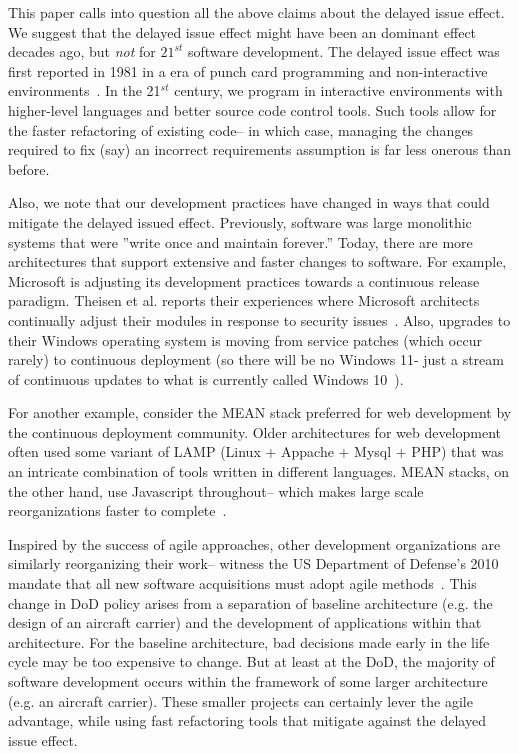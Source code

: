 \documentclass[smallcondesed]{svjour3}
\begin{document}
This paper calls into question all the above claims about the delayed
issue effect. We suggest that the delayed issue effect might have been an dominant
effect decades ago,  but {\em not}  for $21^{\mathit{st}}$
software development. 
 The delayed issue effect was first reported in 1981 in a era of punch card programming
and non-interactive environments~\cite{Boehm81}. In the 21$^\mathit{st}$ century, we  program in 
interactive environments with higher-level languages and better source code control
tools. Such tools allow for the faster refactoring of existing
code-- in which case, 
managing the changes required to fix (say) an incorrect requirements assumption
is far less    onerous    than before.

Also, we note that our development practices have changed in ways that could   mitigate the delayed issued effect.  Previously,
software was large monolithic systems that were ''write once and maintain
forever.'' Today, there are more architectures that
support  extensive and faster changes to software. 
For example, 
Microsoft is adjusting its development practices towards a continuous
release paradigm. Theisen et al. reports their experiences where Microsoft architects
continually adjust  their modules in response to security issues~\cite{Theisen15}.
Also, upgrades to their Windows operating system is moving from service patches (which occur rarely) to continuous deployment (so there will be no Windows 11- just a stream of continuous updates to what is currently called Windows 10~\cite{bright15}).

For another example, consider the MEAN stack preferred for web development by
the continuous deployment community. Older architectures for web development
often used some variant of LAMP (Linux + Appache + Mysql + PHP) that was an intricate
combination of tools written in different languages. MEAN stacks, on the other hand,
use Javascript throughout-- which makes large scale reorganizations faster to complete~\cite{wayner15}. 

Inspired by the success of agile approaches, other  development organizations are similarly reorganizing their work-- witness the US Department of Defense's 2010 mandate
that all new software acquisitions must adopt agile methods~\cite{kim13}. 
This change in DoD policy arises from a separation of baseline architecture
(e.g. the design of an 
aircraft carrier) and the development of applications within that architecture.
For the baseline architecture, bad decisions
made  early in the life cycle may be too expensive to change.
But at least at the DoD, the majority of software development occurs within
the framework of some larger architecture (e.g. an aircraft carrier).
These smaller projects can certainly lever the agile advantage, while 
using fast refactoring tools that mitigate against  the delayed issue effect.
\end{document}
